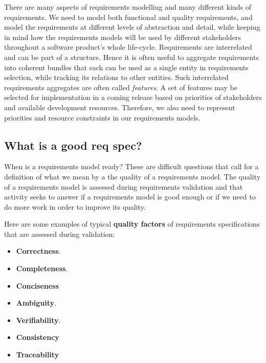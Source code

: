 There are many aspects of requirements modelling and many different kinds of requirements. We need to model both functional and quality requirements, and model the requirements at different levels of abstraction and detail, while keeping in mind how the requirements models will be used by different stakeholders throughout a software product's whole life-cycle. Requirements are interrelated and can be part of a structure. Hence it is often useful to aggregate requirements into coherent bundles that each can be used as a single entity in requirements selection, while tracking its relations to other entities. Such interrelated requirements aggregates are often called \emph{features}. A set of features may be selected for implementation in a coming release based on priorities of stakeholders and available development resources. Therefore, we also need to represent priorities and resource constraints in our requirements models.


\subsection{What is a good req spec?}

 When is a requirements model ready? These are difficult questions that call for a definition of what we mean by a the quality of a requirements model. The quality of a requirements model is assessed during requirements validation and that activity seeks to answer if a requirements model is good enough or if we need to do more work in order to improve its quality.

Here are some examples of typical \textbf{quality factors} of requirements specifications that are assessed during validation:
\begin{itemize}
  \item \textbf{Correctness}. 
  \item \textbf{Completeness}.
  \item \textbf{Conciseness}
  \item \textbf{Ambiguity}.
  \item \textbf{Verifiability}.
  \item \textbf{Consistency}
  \item \textbf{Traceability}
\end{itemize}




